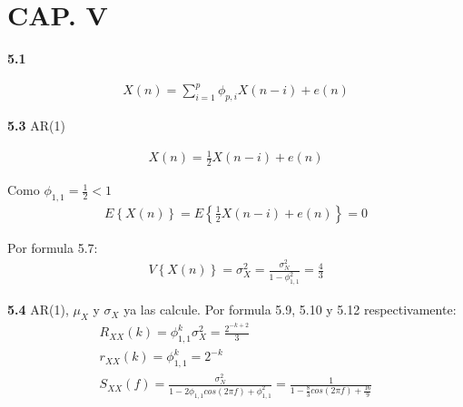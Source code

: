 



\newcommand{\h}{\overset{H_1}{\underset{H_0}{\gtrless}}}

\section*{CAP. V}

\textbf{5.1}

\begin{equation*}
\begin{split}
	X(n) = \sum_{i=1}^{p} \phi_{p,i} X(n-i) + e(n)
\end{split}
\end{equation*}

\vspace{1cm}

\textbf{5.3} AR(1)

\begin{equation*}
\begin{split}
	X(n) = \frac{1}{2} X(n-i) + e(n)
\end{split}
\end{equation*}

Como $\phi_{1,1} = \frac{1}{2} < 1$
\begin{equation*}
\begin{split}
	E \left\lbrace X(n) \right\rbrace  = E \left\lbrace \frac{1}{2} X(n-i) + e(n) \right\rbrace = 0
\end{split}
\end{equation*}

Por formula 5.7:
\begin{equation*}
\begin{split}
	V \left\lbrace X(n) \right\rbrace  = \sigma_X^2 = \frac{\sigma_N^2}{1 - \phi_{1,1}^2} = \frac{4}{3}
\end{split}
\end{equation*}

\vspace{1cm}

\textbf{5.4} AR(1), $\mu_X$ y $\sigma_X$ ya las calcule. Por formula 5.9, 5.10 y 5.12 respectivamente:
\begin{equation*}
\begin{gathered}
	R_{XX}(k) = \phi_{1,1}^k \sigma_X^2 = \frac{2^{-k + 2}}{3} \\
	r_{XX}(k) = \phi_{1,1}^k = 2^{-k}	\\
	S_{XX}(f) = \frac{\sigma_N^2}{1 - 2\phi_{1,1} cos(2\pi f) + \phi_{1,1}^2} = \frac{1}{1 - \frac{8}{3} cos(2\pi f) + \frac{16}{9}}
\end{gathered}
\end{equation*}

